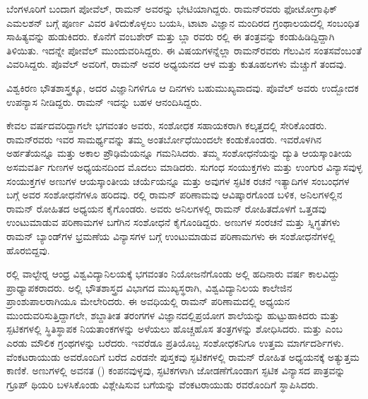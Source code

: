 ಬೆಂಗಳೂರಿಗೆ ಬಂದಾಗ ಪೋವೆಲ್, ರಾಮನ್ ಅವರನ್ನು ಭೇಟಿಯಾಗಿದ್ದರು. ರಾಮನ್‍ರವರು ಫೋಟೋಗ್ರಾಫಿಕ್ ಎಮಲಶನ್ ಬಗ್ಗೆ ಪೂರ್ಣ ವಿವರ ತಿಳಿದುಕೊಳ್ಳಲು ಬಯಸಿ, ಟಾಟಾ ವಿಜ್ಞಾನ ಮಂದಿರದ ಗ್ರಂಥಾಲಯದಲ್ಲಿ ಸಂಬಂಧಿತ ಸಾಹಿತ್ಯವನ್ನು ಹುಡುಕಿದರು. ಕೊನೆಗೆ ವಂಬಶೇರ್ ಮತ್ತು ಬ್ಲಾ ರವರು ರಲ್ಲಿ ಈ ತಂತ್ರವನ್ನು ಕಂಡುಹಿಡಿದ್ದಿದ್ದಾಗಿ ತಿಳಿಯಿತು. ಇದನ್ನೇ ಪೋವೆಲ್ ಮುಂದುವರಿಸಿದ್ದರು. ಈ ವಿಷಯಗಳನ್ನೆಲ್ಲಾ ರಾಮನ್‍ರವರು ಗೆಲುವಿನ ಸಂತಸವೆಂಬಂತೆ ವಿವರಿಸಿದ್ದರು. ಪೊವೆಲ್ ಅವರಿಗೆ, ರಾಮನ್ ಅವರ ಅಧ್ಯಯನದ ಆಳ ಮತ್ತು ಕುತೂಹಲಗಳು ಮೆಚ್ಚುಗೆ ತಂದವು.

ವಿಶ್ವಕಿರಣ ಭೌತಶಾಸ್ತ್ರಕ್ಕೂ, ಅದರ ವಿಜ್ಞಾನಿಗಳಿಗೂ ಆ ದಿನಗಳು ಬಹುಮುಖ್ಯವಾದವು. ಪೊವೆಲ್ ಅವರು ಉದ್ಬೋದಕ ಉಪನ್ಯಾಸ ನೀಡಿದ್ದರು. ರಾಮನ್ ಇದನ್ನು ಬಹಳ ಆನಂದಿಸಿದ್ದರು.



ಕೇವಲ  ವರ್ಷದವರಿದ್ದಾಗಲೇ ಭಗವಂತಂ ಅವರು, ಸಂಶೋಧಕ ಸಹಾಯಕರಾಗಿ ಕಲ್ಕತ್ತದಲ್ಲಿ ಸೇರಿಕೊಂಡರು. ರಾಮನ್‍ರವರು ಇವರ ಸಾಮರ್ಥ್ಯವನ್ನು ತಮ್ಮ ಅಂತರ್ಬೋಧೆಯಿಂದಲೇ ಕಂಡುಕೊಂಡರು. ಇವರೊಳಗಿನ ಅರ್ಹತೆಯನ್ನೂ ಮತ್ತು ಅಕಾಲ ಪ್ರೌಢಿಮೆಯನ್ನೂ ಗಮನಿಸಿದರು. ತಮ್ಮ ಸಂಶೋಧನೆಯನ್ನು ದ್ಯುತಿ ಆಯಸ್ಕಾಂತೀಯ ಅಸಮವರ್ತಿ ಗುಣಗಳ ಅಧ್ಯಯನದಿಂದ ಮೊದಲು ಮಾಡಿದರು. ಸುಗಂಧ ಸಂಯುಕ್ತಗಳು ಮತ್ತು ಉಂಗುರ ವಿನ್ಯಾಸವುಳ್ಳ ಸಂಯುಕ್ತಗಳ ಅಣುಗಳ ಆಯಸ್ಕಾಂತೀಯ ಚರ್ಯೆಯನ್ನೂ ಮತ್ತು ಅವುಗಳ ಸ್ಫಟಿಕ ರಚನೆ ಇತ್ಯಾದಿಗಳ ಸಂಬಂಧಗಳ ಬಗ್ಗೆ ಅವರ ಸಂಶೋಧನೆಗಳೂ ಹರಿದವು. ರಲ್ಲಿ ರಾಮನ್ ಪರಿಣಾಮವು ಆವಿಷ್ಕಾರಗೊಂಡ ಬಳಿಕ, ಅನಿಲಗಳಲ್ಲಿನ ರಾಮನ್ ರೋಹಿತದ  ಅಧ್ಯಯನ ಕೈಗೊಂಡರು. ಅವರು ಅನಿಲಗಳಲ್ಲಿ ರಾಮನ್ ರೋಹಿತದೊಳಗೆ ಒತ್ತಡವು ಉಂಟುಮಾಡುವ ಪರಿಣಾಮಗಳ ಬಗೆಗಿನ ಸಂಶೋಧನೆ ಕೈಗೊಂಡಿದ್ದರು. ಅಣುಗಳ ಸಂರಚನೆ ಮತ್ತು ಸ್ನಿಗ್ಧತೆಗಳು ರಾಮನ್ ಬ್ಯಾಂಡ್‍ಗಳ ಭ್ರಮಣೆಯ ವಿನ್ಯಾಸಗಳ ಬಗ್ಗೆ ಉಂಟುಮಾಡುವ ಪರಿಣಾಮಗಳು ಈ ಸಂಶೋಧನೆಗಳಲ್ಲಿ ಹೊರಬಿದ್ದವು.

\vskip 1pt

ರಲ್ಲಿ ವಾಲ್ಟೇರ್‍ನ ಆಂಧ್ರ ವಿಶ್ವವಿದ್ಯಾನಿಲಯಕ್ಕೆ ಭಗವಂತಂ ನಿಯೋಜನೆಗೊಂಡು ಅಲ್ಲಿ ಹದಿನಾರು ವರ್ಷ ಕಾಲವಿದ್ದು ಪ್ರಾಧ್ಯಾಪಕರಾದರು. ಅಲ್ಲಿ ಭೌತಶಾಸ್ತ್ರದ ವಿಭಾಗದ ಮುಖ್ಯಸ್ಥರಾಗಿ, ವಿಶ್ವವಿದ್ಯಾನಿಲಯ ಕಾಲೇಜಿನ ಪ್ರಾಂಶುಪಾಲರಾಗಿಯೂ ಮೇಲೇರಿದರು. ಈ ಅವಧಿಯಲ್ಲಿ ರಾಮನ್ ಪರಿಣಾಮದಲ್ಲಿ ಅಧ್ಯಯನ ಮುಂದುವರಿಸುತ್ತಿದ್ದಾಗಲೇ, ಶಬ್ದಾತೀತ ತರಂಗಗಳ ವಿಜ್ಞಾನದಲ್ಲಿ\break ಪ್ರಯೋಗ ಶಾಲೆಯನ್ನು ಹುಟ್ಟುಹಾಕಿದರು ಮತ್ತು ಸ್ಪಟಿಕಗಳಲ್ಲಿ ಸ್ಥಿತಿಸ್ಥಾಪಕ ನಿಯತಾಂಕಗಳನ್ನು ಅಳೆಯಲು ಹೊಚ್ಚಹೊಸ ತಂತ್ರಗಳನ್ನು ಶೋಧಿಸಿದರು. \textit{} ಮತ್ತು \textit{} ಎಂಬ ಎರಡು ಮೌಲಿಕ ಗ್ರಂಥಗಳನ್ನು ಬರೆದರು. ಇವರೆಡೂ ಪ್ರತಿಯೊಬ್ಬ ಸಂಶೋಧಕನಿಗೂ ಉತ್ತಮ ಮಾರ್ಗದರ್ಶಿಗಳು. ವೆಂಕಟರಾಯುಡು ಅವರೊಂದಿಗೆ ಬರೆದ ಎರಡನೇ ಪುಸ್ತಕವು ಸ್ಫಟಿಕಗಳಲ್ಲಿ ರಾಮನ್ ರೋಹಿತ ಅಧ್ಯಯನಕ್ಕೆ ಅತ್ಯುತ್ತಮ ಕಾಣಿಕೆ. ಅಣುಗಳಲ್ಲಿ ಅವನತ () ಕಂಪನವುಳ್ಳವು, ಸ್ಫಟಿಕಗಳಾಗಿ ಜೋಡಣೆಗೊಂಡಾಗ ಸ್ಫಟಿಕ ವಿನ್ಯಾಸದ ಪಾತ್ರವನ್ನು ಗ್ರೂಪ್ ಥಿಯರಿ ಬಳಸಿಕೊಂಡು ವಿಶ್ಲೇಷಿಸುವ ಬಗೆಯನ್ನು ವೆಂಕಟರಾಯುಡು ರವರೊಂದಿಗೆ ಸ್ಥಾಪಿಸಿದರು.


